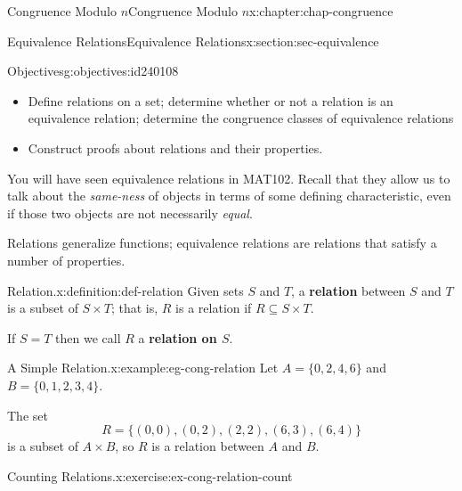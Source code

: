 \documentclass[oneside,10pt,]{book}
\newcommand{\terminology}[1]{\textbf{#1}}
\numberwithin{equation}{section}
\begin{document}
%
%
\typeout{************************************************}
\typeout{************************************************}
%
\begin{chapterptx}{Congruence Modulo \(n\)}{}{Congruence Modulo \(n\)}{}{}{x:chapter:chap-congruence}
%
%
\typeout{************************************************}
\typeout{************************************************}
%
\begin{sectionptx}{Equivalence Relations}{}{Equivalence Relations}{}{}{x:section:sec-equivalence}
\begin{objectives}{Objectives}{g:objectives:id240108}
%
\begin{itemize}[label=\textbullet]
\item{}Define relations on a set; determine whether or not a relation is an equivalence relation; determine the congruence classes of equivalence relations%
\item{}Construct proofs about relations and their properties.%
\end{itemize}
\end{objectives}
You will have seen equivalence relations in MAT102. Recall that they allow us to talk about the \emph{same-ness} of objects in terms of some defining characteristic, even if those two objects are not necessarily \emph{equal}.%
\par
Relations generalize functions; equivalence relations are relations that satisfy a number of properties.%
\begin{definition}{Relation.}{x:definition:def-relation}%
Given sets \(S\) and \(T\), a \terminology{relation} between \(S\) and \(T\) is a subset of \(S \times T\); that is, \(R\) is a relation if \(R \subseteq S \times T\).%
\par
If \(S = T\) then we call \(R\) a \terminology{relation on \(S\)}.%
\end{definition}
\begin{example}{A Simple Relation.}{x:example:eg-cong-relation}%
Let \(A = \{0,2,4,6\}\) and \(B = \{0,1,2,3,4\}\).%
\par
The set%
\begin{equation*}
R = \{(0,0),(0,2),(2,2),(6,3),(6,4)\}
\end{equation*}
is a subset of \(A \times B\), so \(R\) is a relation between \(A\) and \(B\).%
\end{example}
\begin{inlineexercise}{Counting Relations.}{x:exercise:ex-cong-relation-count}%

\end{inlineexercise}
\end{sectionptx}
\end{chapterptx}
\end{document}
